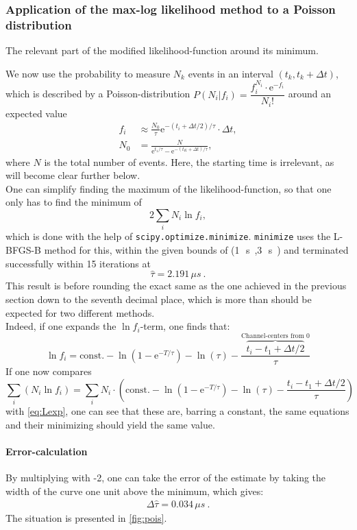 \documentclass[english,  %
parskip=full,   %
headsepline]{scrartcl}
\newcommand{\mus}{\,\si{\mu s\:}}
\newcommand{\e}{\mathrm{e}}
\begin{document}
\subsubsection{Application of the max-log likelihood method to a Poisson distribution}
\begin{floatingfigure}{0.6\linewidth}
 \centering
    
    \caption{The relevant part of the modified likelihood-function around its minimum.}
    \label{fig:pois}
\end{floatingfigure}
We now use the probability to measure $N_k$ events in an interval $(t_k, t_k+\Delta t)$, which is described by a Poisson-distribution $P(N_i|f_i)=\dfrac{f_i^{N_i}\cdot\e^{-f_i}}{N_i!}$ around an expected value 
\begin{align}
f_i&\approx\frac{N_0}{\tau}\e^{-(t_i+\Delta t/2)/\tau}\cdot\Delta t, \label{eq:fi}\\
N_0&=\frac{N}{\e^{t_1/\tau}-\e^{-(t_K+\Delta t)/\tau}},
\end{align}
where $N$ is the total number of events. Here, the starting time is irrelevant, as will become clear further below. \\
One can simplify finding the maximum of the likelihood-function, so that one only has to find the minimum of
\[
2\sum_iN_i\ln f_i,
\]
which is done with the help of \verb+scipy.optimize.minimize+. \verb+minimize+ uses the L-BFGS-B method for this, within the given bounds of (1\mus,3\mus) and terminated successfully within 15 iterations at
\[
\hat{\tau}=2.191\mus.
\]
This result is before rounding the exact same as the one achieved in the previous section down to the seventh decimal place, which is more than should be expected for two different methods. \\
Indeed, if one expands the $\ln f_i$-term, one finds that:
\[
\ln f_i = \mathrm{const.}-\ln\left(1-\e^{-T/\tau}\right)-\ln(\tau)-\frac{\overbrace{t_i-t_1+\Delta t/2}^{\text{Channel-centers from 0}}}{\tau}
\]
If one now compares 
\[
\sum_i(N_i\ln f_i)=\sum_iN_i\cdot\left(\mathrm{const.}-\ln\left(1-\e^{-T/\tau}\right)-\ln(\tau)-\frac{t_i-t_1+\Delta t/2}{\tau}\right)
\]
with \cref{eq:Lexp}, one can see that these are, barring a constant, the same equations and their minimizing should yield the same value.
\paragraph{Error-calculation}
By multiplying with -2, one can take the error of the estimate by taking the width of the curve one unit above the minimum, which gives:
\begin{gather}
    \Delta \hat{\tau} = 0.034 \mus.
\end{gather}
The situation is presented in \cref{fig:pois}.
\clearpage
\end{document}
